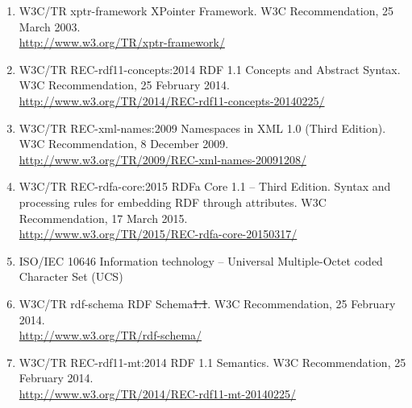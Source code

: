 \documentclass[10pt, a4paper]{isov2}
\providecommand{\DIFaddtex}[1]{{\protect\color{blue}\uwave{#1}}} %
\providecommand{\DIFdeltex}[1]{{\protect\color{red}\sout{#1}}}                      %
\providecommand{\DIFaddbegin}{} %
\providecommand{\DIFaddend}{} %
\providecommand{\DIFdelbegin}{} %
\providecommand{\DIFdelend}{} %
\providecommand{\DIFadd}[1]{\texorpdfstring{\DIFaddtex{#1}}{#1}} %
\providecommand{\DIFdel}[1]{\texorpdfstring{\DIFdeltex{#1}}{}} %
\begin{document}
\begin{enumerate} [label=\bfseries NR\arabic*]
  \DIFdelbegin %
\DIFdelend \DIFaddbegin \item{W3C/TR xptr-framework} \DIFaddend {XPointer Framework.  W3C Recommendation, 25 March 2003. \\ \DIFdelbegin %
\DIFdelend \DIFaddbegin \url{http://www.w3.org/TR/xptr-framework/}\DIFaddend }\label{nref-XPointer}
  \item{W3C/TR REC-rdf11-concepts:2014} {RDF 1.1 Concepts and Abstract Syntax.  W3C Recommendation, 25 February 2014. \\ \url{http://www.w3.org/TR/2014/REC-rdf11-concepts-20140225/}}\label{nref-RDF}
  \item{W3C/TR REC-xml-names:2009} {Namespaces in XML 1.0 (Third Edition). W3C Recommendation, 8 December 2009.\\
   \url{http://www.w3.org/TR/2009/REC-xml-names-20091208/}}\label{nref-XMLns}
  \item{W3C/TR REC-rdfa-core:2015} {RDFa Core 1.1 -- Third Edition.  Syntax and processing rules for embedding RDF through attributes. W3C Recommendation, 17 March 2015.\\ \url{http://www.w3.org/TR/2015/REC-rdfa-core-20150317/}}\label{nref-RDFa}
  \item{ISO/IEC 10646} {Information technology – Universal Multiple-Octet coded Character Set (UCS)\DIFaddbegin \DIFadd{.}\DIFaddend }\label{nref-UCS}
  \DIFdelbegin %
\DIFdelend \DIFaddbegin \item{W3C/TR rdf-schema} \DIFaddend {RDF Schema\DIFdelbegin \DIFdel{1.1}\DIFdelend . W3C Recommendation, 25 February 2014.\\ \DIFdelbegin %
\DIFdelend \DIFaddbegin \url{http://www.w3.org/TR/rdf-schema/}\DIFaddend }\label{nref-RDFS}
  \item{W3C/TR REC-rdf11-mt:2014} {RDF 1.1 Semantics.  W3C Recommendation, 25 February 2014. \\ \url{http://www.w3.org/TR/2014/REC-rdf11-mt-20140225/}}\label{nref-RDFSs}

\end{enumerate}
\end{document}
